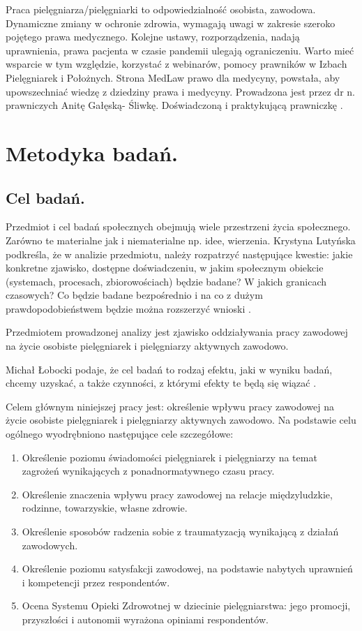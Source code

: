 \documentclass[a4paper,12pt,twoside,openany]{report}
\begin{document}
Praca pielęgniarza/pielęgniarki to odpowiedzialność osobista, zawodowa. Dynamiczne zmiany w ochronie zdrowia, wymagają uwagi w zakresie szeroko pojętego prawa medycznego. Kolejne ustawy, rozporządzenia, nadają uprawnienia, prawa pacjenta w czasie pandemii ulegają ograniczeniu. Warto mieć wsparcie w tym względzie, korzystać z webinarów, pomocy prawników w Izbach Pielęgniarek i Położnych. Strona MedLaw prawo dla medycyny, powstała, aby upowszechniać wiedzę z dziedziny prawa i medycyny. Prowadzona jest przez dr n. prawniczych Anitę Gałęską- Śliwkę. Doświadczoną i praktykującą prawniczkę \cite{anita}.


\chapter{Metodyka badań.}

\section{Cel badań.}
Przedmiot i cel badań społecznych obejmują wiele przestrzeni życia społecznego. Zarówno te materialne jak i niematerialne np. idee, wierzenia. Krystyna Lutyńska podkreśla, że w analizie przedmiotu, należy rozpatrzyć następujące kwestie: jakie konkretne zjawisko, dostępne doświadczeniu, w jakim społecznym obiekcie (systemach, procesach, zbiorowościach) będzie badane? W jakich granicach czasowych? Co będzie badane bezpośrednio i na co z dużym prawdopodobieństwem będzie można rozszerzyć wnioski \cite{krys}.

Przedmiotem prowadzonej analizy jest zjawisko oddziaływania pracy zawodowej na życie osobiste pielęgniarek i pielęgniarzy aktywnych zawodowo.

Michał Łobocki podaje, że cel badań to rodzaj efektu, jaki w wyniku badań, chcemy uzyskać, a także czynności, z którymi efekty te będą się wiązać \cite{mich}.

Celem głównym niniejszej pracy jest: określenie wpływu pracy zawodowej na życie osobiste pielęgniarek i pielęgniarzy aktywnych zawodowo.
Na podstawie celu ogólnego wyodrębniono następujące cele szczegółowe:
\begin{enumerate}
	\item Określenie poziomu świadomości pielęgniarek i pielęgniarzy na temat zagrożeń wynikających z ponadnormatywnego czasu pracy.
	\item Określenie znaczenia wpływu pracy zawodowej na relacje międzyludzkie, rodzinne, towarzyskie, własne zdrowie.
	\item Określenie sposobów radzenia sobie z traumatyzacją wynikającą z działań zawodowych.
	\item Określenie poziomu satysfakcji zawodowej, na podstawie nabytych uprawnień i kompetencji przez respondentów.
	\item Ocena Systemu Opieki Zdrowotnej w dziecinie pielęgniarstwa: jego promocji, przyszłości i autonomii wyrażona opiniami respondentów.
\end{enumerate}
\end{document}

